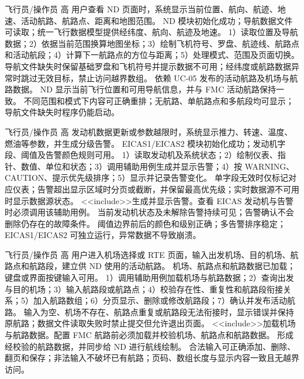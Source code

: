 \documentclass[UTF8,zihao=-4,fontset=none]{ctexart}
\begin{document}
{飞行员/操作员}
{高}
{用户查看 ND 页面时，系统显示当前位置、航向、航迹、地速、活动航路、航路点、距离和地图范围。}
{ND 模块初始化成功；导航数据文件可读取；统一飞行数据模型提供经纬度、航向、航迹及地速。}
{1）读取位置及导航数据；2）依据当前范围换算地图坐标；3）绘制飞机符号、罗盘、航迹线、航路点和活动航段；4）计算下一航路点的方位与距离；5）处理模式、范围及页面切换。}
{导航文件缺失时保留基础罗盘和飞机符号并提示数据不可用；经纬度或航路数据异常时跳过无效目标，禁止访问越界数组。}
{依赖 UC-05 发布的活动航路及机场与航路数据。}
\usecaseend
{ND 显示当前飞行位置和可用导航信息，并与 FMC 活动航路保持一致。}
{不同范围和模式下内容可正确重排；无航路、单航路点和多航段均可显示；导航文件缺失时程序仍能启动。}

{飞行员/操作员}
{高}
{发动机数据更新或参数越限时，系统显示推力、转速、温度、燃油等参数，并生成分级告警。}
{EICAS1/EICAS2 模块初始化成功；发动机字段、阈值及告警颜色规则可用。}
{1）读取发动机及系统状态；2）绘制仪表、指针、数值、单位和状态；3）调用辅助用例生成并显示告警；4）按 WARNING、CAUTION、提示优先级排序；5）显示并记录告警变化。}
{单字段无效时仅标记对应仪表；告警超出显示区域时分页或截断，并保留最高优先级；实时数据源不可用时显示数据源状态。}
{\textless\textless include\textgreater\textgreater 生成并显示告警。查看 EICAS 发动机与告警时必须调用该辅助用例。}
\usecaseend
{当前发动机状态及未解除告警持续可见；告警确认不会删除仍存在的故障条件。}
{阈值边界前后的颜色和级别正确；多告警排序稳定；EICAS1/EICAS2 可独立运行，异常数据不导致崩溃。}

{飞行员/操作员}
{高}
{用户进入机场选择或 RTE 页面，输入出发机场、目的机场、航路点和航路段，建立供 ND 使用的活动航路。}
{机场、航路点和航路数据已加载；键盘或界面按键输入可用。}
{1）调用辅助用例加载机场与航路数据；2）查询出发与目的机场；3）输入航路段或航路点；4）校验存在性、重复性和航路段衔接关系；5）加入航路数组；6）分页显示、删除或修改航路段；7）确认并发布活动航路。}
{输入为空、机场不存在、航路点重复或航路段无法衔接时，显示错误并保持原航路；数据文件读取失败时禁止提交但允许退出页面。}
{\textless\textless include\textgreater\textgreater 加载机场与航路数据。配置 FMC 航路前必须加载并校验机场、航路点和航路数据。}
\usecaseend
{形成经校验的航路数据，并同步给 ND 进行航线绘制。}
{合法输入可正确添加、删除、翻页和保存；非法输入不破坏已有航路；页码、数组长度与显示内容一致且无越界访问。}
\end{document}
